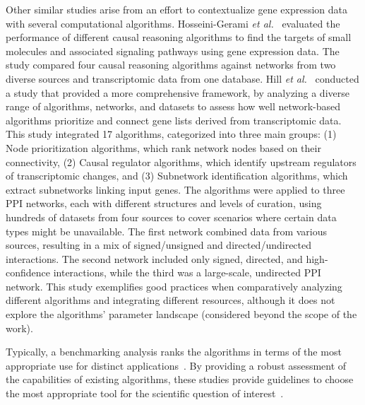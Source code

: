 Other similar studies arise from an effort to contextualize gene expression data with several computational algorithms.
Hosseini-Gerami \textit{et al.}~\cite{RN53} evaluated the performance of different causal reasoning algorithms to find the targets of small molecules and associated signaling pathways using gene expression data.
The study compared four causal reasoning algorithms against networks from two diverse sources and transcriptomic data from one database.
Hill \textit{et al.}~\cite{RN37} conducted a study that provided a more comprehensive framework, by analyzing a diverse range of algorithms, networks, and datasets to assess how well network-based algorithms prioritize and connect gene lists derived from transcriptomic data.
This study integrated 17 algorithms, categorized into three main groups: (1) Node prioritization algorithms, which rank network nodes based on their connectivity, (2) Causal regulator algorithms, which identify upstream regulators of transcriptomic changes, and (3) Subnetwork identification algorithms, which extract subnetworks linking input genes.
The algorithms were applied to three \gls{PPI} networks, each with different structures and levels of curation, using hundreds of datasets from four sources to cover scenarios where certain data types might be unavailable.
The first network combined data from various sources, resulting in a mix of signed/unsigned and directed/undirected interactions.
The second network included only signed, directed, and high-confidence interactions, while the third was a large-scale, undirected \gls{PPI} network.
This study exemplifies good practices when comparatively analyzing different algorithms and integrating different resources, although it does not explore the algorithms' parameter landscape (considered beyond the scope of the work).

Typically, a benchmarking analysis ranks the algorithms in terms of the most appropriate use for distinct applications~\cite{RN37}.
By providing a robust assessment of the capabilities of existing algorithms, these studies provide guidelines to choose the most appropriate tool for the scientific question of interest~\cite{RN108}.

